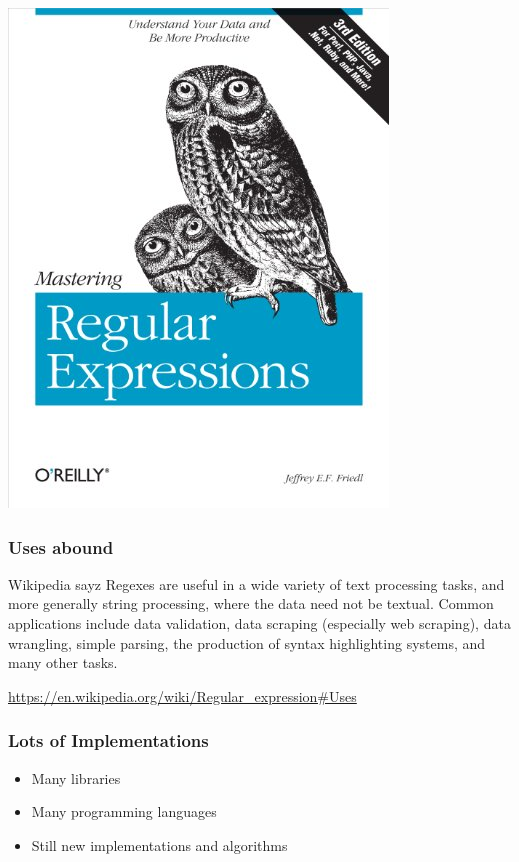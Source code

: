 \documentclass[pdftex]{beamer}
\begin{document}
\begin{frame}
\begin{center}
    \includegraphics[scale=0.25]{book-mastering-regular-expressions}
  \end{center}
\end{frame}

\begin{frame}
  \frametitle{Uses abound}
  \begin{block}{Wikipedia sayz}
    Regexes are useful in a wide variety of text processing tasks, and
    more generally string processing, where the data need not be
    textual. Common applications include data validation, data
    scraping (especially web scraping), data wrangling, simple
    parsing, the production of syntax highlighting systems, and many
    other tasks.

    \url{https://en.wikipedia.org/wiki/Regular_expression\#Uses}
  \end{block}
\end{frame}

\begin{frame}
  \frametitle{Lots of Implementations}
  \begin{itemize}
  \item Many libraries
  \item Many programming languages
  \item Still new implementations and algorithms
  \end{itemize}
\end{frame}
\end{document}
